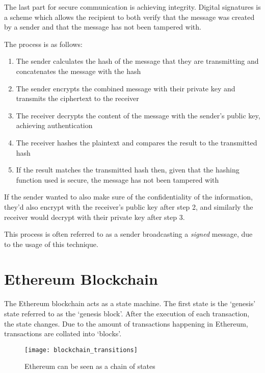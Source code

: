 The last part for secure communication is achieving integrity. Digital signatures is a scheme which allows the recipient to both verify that the message was created by a sender and that the message has not been tampered with. 

The process is as follows:
\begin{enumerate}
    \item The sender calculates the hash of the message that they are transmitting and concatenates the message with the hash
    \item The sender encrypts the combined message with their private key and transmits the ciphertext to the receiver  
    \item The receiver decrypts the content of the message with the sender's public key, achieving authentication
    \item The receiver hashes the plaintext and compares the result to the transmitted hash
    \item If the result matches the transmitted hash  then, given that the hashing function used is secure,
    the message has not been tampered with
\end{enumerate}

If the sender wanted to also make sure of the confidentiality of the information, they'd also encrypt with the receiver's public key after step 2, and similarly the receiver would decrypt with their private key after step 3. 

This process is often referred to as a sender broadcasting a \textit{signed} message, due to the usage of this technique.


\section{Ethereum Blockchain}
The Ethereum blockchain acts as a state machine. The first state is the `genesis' state referred to as the `genesis block'. After the execution of each transaction, the state changes. Due to the amount of transactions happening in Ethereum, transactions are collated into `blocks'. 

\begin{figure}[H]
    \centering
    \texttt{[image: blockchain\_transitions]}
    \caption{Ethereum can be seen as a chain of states \cite{visual}}
    \label{worldstate_update}
\end{figure}

